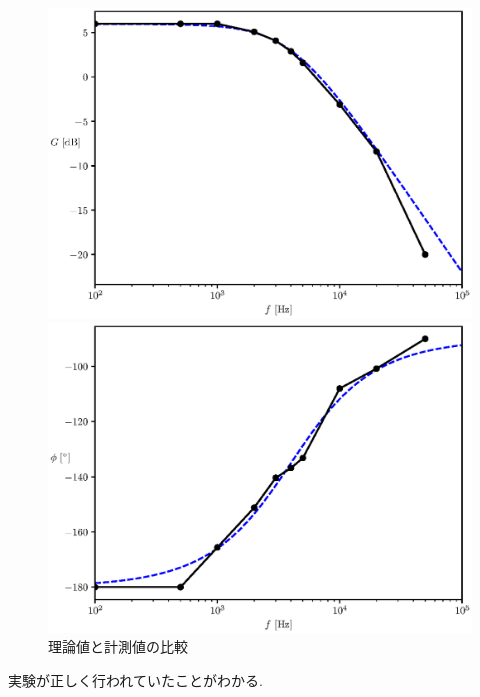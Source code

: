 \documentclass[titlepage]{jsarticle}
\begin{document}
        \begin{figure}[h]
            \begin{minipage}{0.5\hsize}
                \centering
                \includegraphics[width=1.1\hsize]{img/intex2-1.eps}
            \end{minipage}
            \begin{minipage}{0.5\hsize}
                \centering
                \includegraphics[width=1.1\hsize]{img/intex2-2.eps}
            \end{minipage}
            \caption{理論値と計測値の比較}
            \label{fig:intex2}
        \end{figure}
        
        実験が正しく行われていたことがわかる.
\end{document}
